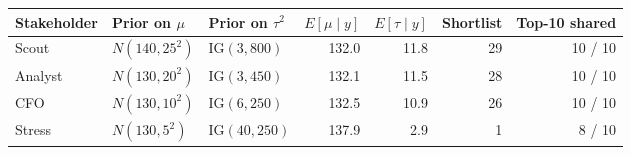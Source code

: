 \begin{tabular}{lllrrrr}
\toprule
Stakeholder & Prior on $\mu$ & Prior on $\tau^2$ & $E[\mu\mid y]$ & $E[\tau\mid y]$ & Shortlist & Top-10 shared \\
\midrule
Scout & $N(140,25^2)$ & $\mathrm{IG}(3,800)$ & 132.0 & 11.8 & 29 & 10 / 10 \\
Analyst & $N(130,20^2)$ & $\mathrm{IG}(3,450)$ & 132.1 & 11.5 & 28 & 10 / 10 \\
CFO & $N(130,10^2)$ & $\mathrm{IG}(6,250)$ & 132.5 & 10.9 & 26 & 10 / 10 \\
Stress & $N(130,5^2)$ & $\mathrm{IG}(40,250)$ & 137.9 & 2.9 & 1 & 8 / 10 \\
\bottomrule
\end{tabular}